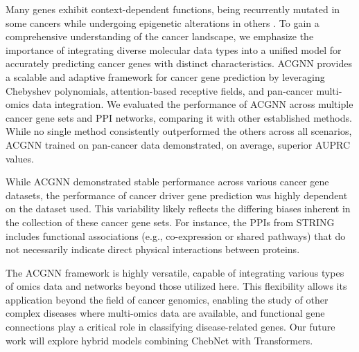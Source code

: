 Many genes exhibit context-dependent functions, being recurrently mutated in some cancers while undergoing epigenetic alterations in others \cite{baylin2016epigenetic,bell2019principles,repana2019ncg}.
To gain a comprehensive understanding of the cancer landscape, we emphasize the importance of integrating diverse molecular data types into a unified model for accurately predicting cancer genes with distinct characteristics.
ACGNN provides a scalable and adaptive framework for cancer gene prediction by leveraging Chebyshev polynomials, attention-based receptive fields, and pan-cancer multi-omics data integration. 
We evaluated the performance of ACGNN  across multiple cancer gene sets and PPI networks, comparing it with other established methods. While no single method consistently outperformed the others across all scenarios, ACGNN  trained on pan-cancer data demonstrated, on average, superior AUPRC values. 

While ACGNN  demonstrated stable performance across various cancer gene datasets, the performance of cancer driver gene prediction was highly dependent on the dataset used. This variability likely reflects the differing biases inherent in the collection of these cancer gene sets. For instance, the PPIs from STRING includes functional associations (e.g., co-expression or shared pathways) that do not necessarily indicate direct physical interactions between proteins. 

The ACGNN  framework is highly versatile, capable of integrating various types of omics data and networks beyond those utilized here. This flexibility allows its application beyond the field of cancer genomics, enabling the study of other complex diseases where multi-omics data are available, and functional gene connections play a critical role in classifying disease-related genes. Our future work will explore hybrid models combining ChebNet with Transformers.



